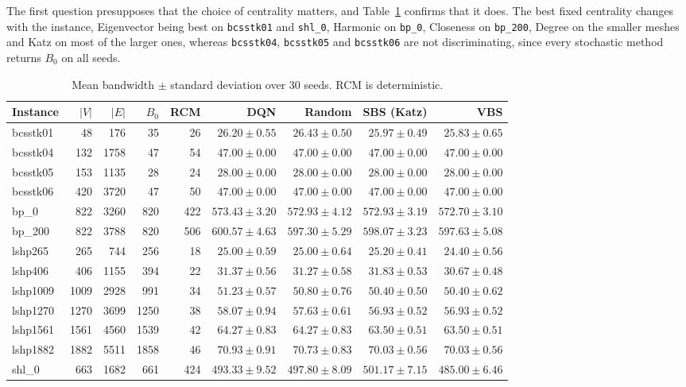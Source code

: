 \documentclass[runningheads]{llncs}
\begin{document}
The first question presupposes that the choice of centrality matters, and Table~\ref{tab:mainresults} confirms that it does. The best fixed centrality changes with the instance, Eigenvector being best on \texttt{bcsstk01} and \texttt{shl\_0}, Harmonic on \texttt{bp\_0}, Closeness on \texttt{bp\_200}, Degree on the smaller meshes and Katz on most of the larger ones, whereas \texttt{bcsstk04}, \texttt{bcsstk05} and \texttt{bcsstk06} are not discriminating, since every stochastic method returns $B_0$ on all seeds.

\begin{table}[!tb]
\centering
\caption{Mean bandwidth $\pm$ standard deviation over 30 seeds. RCM is deterministic.}
\label{tab:mainresults}
\scriptsize
\setlength{\tabcolsep}{2.6pt}
\begin{tabular}{lrrrrrrrr}
\toprule
Instance & $|V|$ & $|E|$ & $B_0$ & RCM & DQN & Random & SBS (Katz) & VBS\\
\midrule
bcsstk01 & 48 & 176 & 35 & 26 & $26.20\pm0.55$ & $26.43\pm0.50$ & $25.97\pm0.49$ & $\mathbf{25.83\pm0.65}$\\
bcsstk04 & 132 & 1758 & 47 & 54 & $47.00\pm0.00$ & $47.00\pm0.00$ & $47.00\pm0.00$ & $47.00\pm0.00$\\
bcsstk05 & 153 & 1135 & 28 & 24 & $28.00\pm0.00$ & $28.00\pm0.00$ & $28.00\pm0.00$ & $28.00\pm0.00$\\
bcsstk06 & 420 & 3720 & 47 & 50 & $47.00\pm0.00$ & $47.00\pm0.00$ & $47.00\pm0.00$ & $47.00\pm0.00$\\
bp\_0 & 822 & 3260 & 820 & 422 & $573.43\pm3.20$ & $572.93\pm4.12$ & $572.93\pm3.19$ & $\mathbf{572.70\pm3.10}$\\
bp\_200 & 822 & 3788 & 820 & 506 & $600.57\pm4.63$ & $\mathbf{597.30\pm5.29}$ & $598.07\pm3.23$ & $597.63\pm5.08$\\
lshp265 & 265 & 744 & 256 & 18 & $25.00\pm0.59$ & $25.00\pm0.64$ & $25.20\pm0.41$ & $\mathbf{24.40\pm0.56}$\\
lshp406 & 406 & 1155 & 394 & 22 & $31.37\pm0.56$ & $31.27\pm0.58$ & $31.83\pm0.53$ & $\mathbf{30.67\pm0.48}$\\
lshp1009 & 1009 & 2928 & 991 & 34 & $51.23\pm0.57$ & $50.80\pm0.76$ & $\mathbf{50.40\pm0.50}$ & $\mathbf{50.40\pm0.62}$\\
lshp1270 & 1270 & 3699 & 1250 & 38 & $58.07\pm0.94$ & $57.63\pm0.61$ & $\mathbf{56.93\pm0.52}$ & $\mathbf{56.93\pm0.52}$\\
lshp1561 & 1561 & 4560 & 1539 & 42 & $64.27\pm0.83$ & $64.27\pm0.83$ & $\mathbf{63.50\pm0.51}$ & $\mathbf{63.50\pm0.51}$\\
lshp1882 & 1882 & 5511 & 1858 & 46 & $70.93\pm0.91$ & $70.73\pm0.83$ & $\mathbf{70.03\pm0.56}$ & $\mathbf{70.03\pm0.56}$\\
shl\_0 & 663 & 1682 & 661 & 424 & $493.33\pm9.52$ & $497.80\pm8.09$ & $501.17\pm7.15$ & $\mathbf{485.00\pm6.46}$\\
\bottomrule
\end{tabular}
\end{table}
\end{document}

